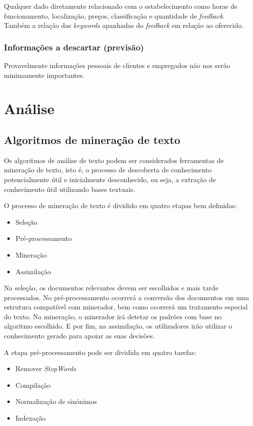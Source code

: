 \documentclass[a4paper,10pt]{article}
\begin{document}
Qualquer dado diretamente relacionado com o estabelecimento como horas de funcionamento, localização, preços, classificação e quantidade de \textit{feedback}.
Também a relação das \textit{keywords} apanhadas do \textit{feedback} em relação ao oferecido.

\subsubsection{Informações a descartar (previsão)}

Provavelmente informações pessoais de clientes e empregados não nos serão minimamente importantes.

\section{Análise}
\subsection{Algoritmos de mineração de texto}

Os algoritmos de análise de texto podem ser considerados ferramentas de mineração de texto, isto é, o processo de descoberta de conhecimento potencialmente útil e inicialmente desconhecido, ou seja, a extração de conhecimento útil utilizando bases textuais.\cite{tds4}

O processo de mineração de texto é dividido em quatro etapas bem definidas:
\begin{itemize}
  \item Seleção
  \item Pré-processamento
  \item Mineração
  \item Assimilação
\end{itemize}

Na seleção, os documentos relevantes devem ser escolhidos e mais tarde processados.
No pré-processamento ocorrerá a conversão dos documentos em uma estrutura compatível com minerador, bem como ocorrerá um tratamento especial do texto.
Na mineração, o minerador irá detetar os padrões com base no algoritmo escolhido.
E por fim, na assimilação, os utilizadores irão utilizar o conhecimento gerado para apoiar as suas decisões.\cite{oth1}

A etapa pré-processamento pode ser dividida em quatro tarefas:
\begin{itemize}
  \item Remover \textit{StopWords}
  \item Compilação
  \item Normalização de sinónimos
  \item Indexação
\end{itemize}
\end{document}
